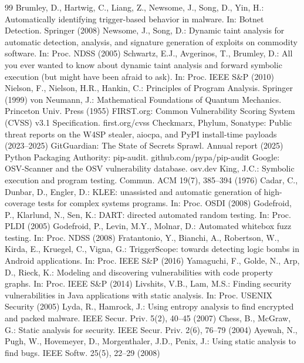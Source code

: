 \documentclass[runningheads]{llncs}
\begin{document}
\begin{thebibliography}{99}
 Brumley, D., Hartwig, C., Liang, Z., Newsome, J., Song, D., Yin, H.: Automatically identifying trigger-based behavior in malware. In: Botnet Detection. Springer (2008)
 Newsome, J., Song, D.: Dynamic taint analysis for automatic detection, analysis, and signature generation of exploits on commodity software. In: Proc. NDSS (2005)
 Schwartz, E.J., Avgerinos, T., Brumley, D.: All you ever wanted to know about dynamic taint analysis and forward symbolic execution (but might have been afraid to ask). In: Proc. IEEE S\&P (2010)
 Nielson, F., Nielson, H.R., Hankin, C.: Principles of Program Analysis. Springer (1999)
 von Neumann, J.: Mathematical Foundations of Quantum Mechanics. Princeton Univ. Press (1955)
 FIRST.org: Common Vulnerability Scoring System (CVSS) v3.1 Specification. first.org/cvss
 Checkmarx, Phylum, Sonatype: Public threat reports on the W4SP stealer, aiocpa, and PyPI install-time payloads (2023--2025)
 GitGuardian: The State of Secrets Sprawl. Annual report (2025)
 Python Packaging Authority: pip-audit. github.com/pypa/pip-audit
 Google: OSV-Scanner and the OSV vulnerability database. osv.dev
 King, J.C.: Symbolic execution and program testing. Commun. ACM 19(7), 385--394 (1976)
 Cadar, C., Dunbar, D., Engler, D.: KLEE: unassisted and automatic generation of high-coverage tests for complex systems programs. In: Proc. OSDI (2008)
 Godefroid, P., Klarlund, N., Sen, K.: DART: directed automated random testing. In: Proc. PLDI (2005)
 Godefroid, P., Levin, M.Y., Molnar, D.: Automated whitebox fuzz testing. In: Proc. NDSS (2008)
 Fratantonio, Y., Bianchi, A., Robertson, W., Kirda, E., Kruegel, C., Vigna, G.: TriggerScope: towards detecting logic bombs in Android applications. In: Proc. IEEE S\&P (2016)
 Yamaguchi, F., Golde, N., Arp, D., Rieck, K.: Modeling and discovering vulnerabilities with code property graphs. In: Proc. IEEE S\&P (2014)
 Livshits, V.B., Lam, M.S.: Finding security vulnerabilities in Java applications with static analysis. In: Proc. USENIX Security (2005)
 Lyda, R., Hamrock, J.: Using entropy analysis to find encrypted and packed malware. IEEE Secur. Priv. 5(2), 40--45 (2007)
 Chess, B., McGraw, G.: Static analysis for security. IEEE Secur. Priv. 2(6), 76--79 (2004)
 Ayewah, N., Pugh, W., Hovemeyer, D., Morgenthaler, J.D., Penix, J.: Using static analysis to find bugs. IEEE Softw. 25(5), 22--29 (2008)

\end{thebibliography}
\end{document}
